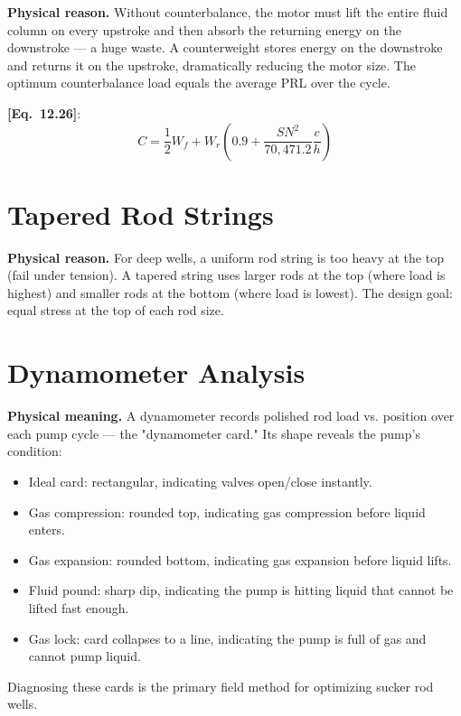 \documentclass[11pt,a4paper,openany]{book}
\newcommand{\eqrefbook}[1]{\textcolor{blue!60!black}{\textbf{[Eq.~#1]}}}
\begin{document}
\begin{theory}
\textbf{Physical reason.} Without counterbalance, the motor must lift
the entire fluid column on every upstroke and then absorb the
returning energy on the downstroke — a huge waste. A counterweight
stores energy on the downstroke and returns it on the upstroke,
dramatically reducing the motor size. The optimum counterbalance load
equals the average PRL over the cycle.
\end{theory}

\eqrefbook{12.26}:
\begin{equation}
  C = \frac{1}{2}W_f + W_r\left(0.9 +
  \frac{SN^2}{70{,}471.2}\frac{c}{h}\right)
\end{equation}

\section{Tapered Rod Strings}

\begin{theory}
\textbf{Physical reason.} For deep wells, a uniform rod string is too
heavy at the top (fail under tension). A tapered string uses larger
rods at the top (where load is highest) and smaller rods at the bottom
(where load is lowest). The design goal: equal stress at the top of
each rod size.
\end{theory}

\section{Dynamometer Analysis}

\begin{theory}
\textbf{Physical meaning.} A dynamometer records polished rod load vs.
position over each pump cycle — the "dynamometer card." Its shape
reveals the pump's condition:
\begin{itemize}
  \item Ideal card: rectangular, indicating valves open/close
        instantly.
  \item Gas compression: rounded top, indicating gas compression
        before liquid enters.
  \item Gas expansion: rounded bottom, indicating gas expansion
        before liquid lifts.
  \item Fluid pound: sharp dip, indicating the pump is hitting
        liquid that cannot be lifted fast enough.
  \item Gas lock: card collapses to a line, indicating the pump is
        full of gas and cannot pump liquid.
\end{itemize}

Diagnosing these cards is the primary field method for optimizing
sucker rod wells.
\end{theory}
\end{document}
